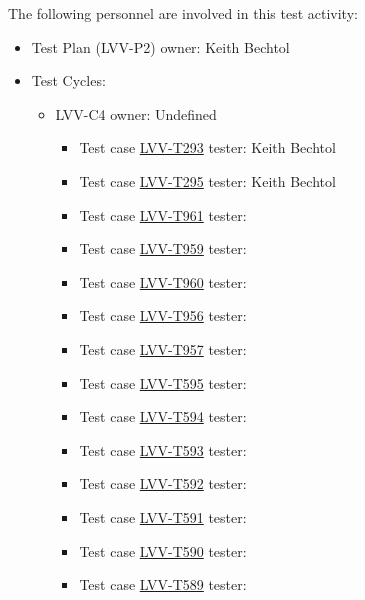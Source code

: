 \documentclass[DM,lsstdraft,STR,toc]{lsstdoc}
\begin{document}
The following personnel are involved in this test activity:

\begin{itemize}
\item Test Plan (LVV-P2) owner: Keith Bechtol
\item Test Cycles:
\begin{itemize}
  \item LVV-C4 owner: 
    Undefined
  \begin{itemize}
    \item Test case \href{https://jira.lsstcorp.org/secure/Tests.jspa#/testCase/LVV-T293}{LVV-T293} tester: Keith Bechtol
    \item Test case \href{https://jira.lsstcorp.org/secure/Tests.jspa#/testCase/LVV-T295}{LVV-T295} tester: Keith Bechtol
    \item Test case \href{https://jira.lsstcorp.org/secure/Tests.jspa#/testCase/LVV-T961}{LVV-T961} tester: 
    \item Test case \href{https://jira.lsstcorp.org/secure/Tests.jspa#/testCase/LVV-T959}{LVV-T959} tester: 
    \item Test case \href{https://jira.lsstcorp.org/secure/Tests.jspa#/testCase/LVV-T960}{LVV-T960} tester: 
    \item Test case \href{https://jira.lsstcorp.org/secure/Tests.jspa#/testCase/LVV-T956}{LVV-T956} tester: 
    \item Test case \href{https://jira.lsstcorp.org/secure/Tests.jspa#/testCase/LVV-T957}{LVV-T957} tester: 
    \item Test case \href{https://jira.lsstcorp.org/secure/Tests.jspa#/testCase/LVV-T595}{LVV-T595} tester: 
    \item Test case \href{https://jira.lsstcorp.org/secure/Tests.jspa#/testCase/LVV-T594}{LVV-T594} tester: 
    \item Test case \href{https://jira.lsstcorp.org/secure/Tests.jspa#/testCase/LVV-T593}{LVV-T593} tester: 
    \item Test case \href{https://jira.lsstcorp.org/secure/Tests.jspa#/testCase/LVV-T592}{LVV-T592} tester: 
    \item Test case \href{https://jira.lsstcorp.org/secure/Tests.jspa#/testCase/LVV-T591}{LVV-T591} tester: 
    \item Test case \href{https://jira.lsstcorp.org/secure/Tests.jspa#/testCase/LVV-T590}{LVV-T590} tester: 
    \item Test case \href{https://jira.lsstcorp.org/secure/Tests.jspa#/testCase/LVV-T589}{LVV-T589} tester: 

\end{itemize}
\end{itemize}
\end{itemize}
\end{document}
